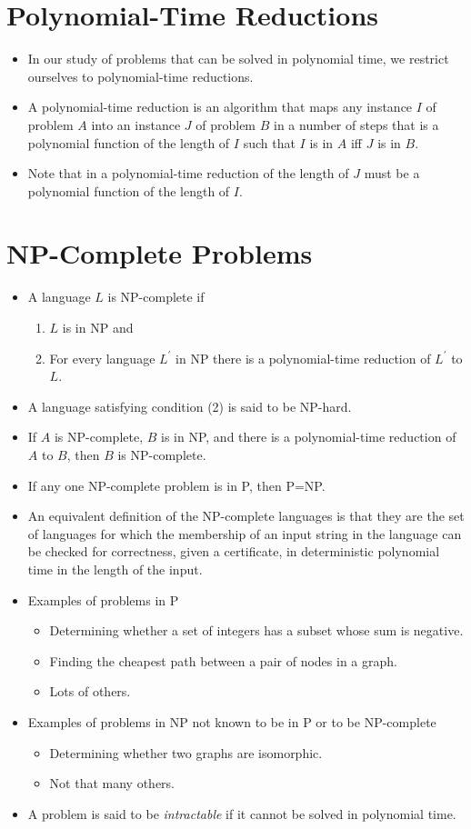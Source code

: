 \documentclass[]{article}
\begin{document}
\section{Polynomial-Time Reductions}
\begin{itemize}
\item In our study of problems that can be solved in polynomial time, we
restrict ourselves to polynomial-time reductions.
\item A polynomial-time reduction is an algorithm that maps any instance $I$ of
problem $A$ into an instance $J$ of problem $B$ in a number of steps that is a
polynomial function of the length of $I$ such that $I$ is in $A$ iff $J$ is in
$B$.
\item Note that in a polynomial-time reduction of the length of $J$ must be a
polynomial function of the length of $I$.
\end{itemize}

\section{NP-Complete Problems}
\begin{itemize}
\item A language $L$ is NP-complete if
\begin{enumerate}
\item $L$ is in NP and
\item For every language $L^\prime$ in NP there is a polynomial-time reduction
of $L^\prime$ to $L$.
\end{enumerate}
\item A language satisfying condition (2) is said to be NP-hard.
\item If $A$ is NP-complete, $B$ is in NP, and there is a polynomial-time
reduction of $A$ to $B$, then $B$ is NP-complete.
\item If any one NP-complete problem is in P, then P=NP.
\item An equivalent definition of the NP-complete languages is that they are the
set of languages for which the membership of an input string in the language can
be checked for correctness, given a certificate, in deterministic polynomial
time in the length of the input.
\item Examples of problems in P
\begin{itemize}
\item Determining whether a set of integers has a subset whose sum is negative.
\item Finding the cheapest path between a pair of nodes in a graph.
\item Lots of others.
\end{itemize}
\item Examples of problems in NP not known to be in P or to be NP-complete
\begin{itemize}
\item Determining whether two graphs are isomorphic.
\item Not that many others.
\end{itemize}
\item A problem is said to be \emph{intractable} if it cannot be solved in
polynomial time.
\end{itemize}
\end{document}
